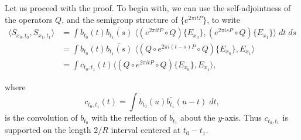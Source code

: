 Let us proceed with the proof. To begin with, we can use the self-adjointness of the operators $Q$, and the semigroup structure of $\{ e^{2 \pi i t P} \}$, to write
%
\begin{align*}
    \langle {S\!}_{x_0,t_0}, {S\!}_{x_1,t_1} \rangle &= \int b_{t_0}(t) \overline{b_{t_1}(s)}\; \Big\langle (e^{2 \pi i t P} \circ Q) \{ E_{x_0} \}, (e^{2 \pi i s P} \circ Q) \{ E_{x_1} \} \Big\rangle\; dt\; ds\\
    &= \int b_{t_0}(t) \overline{b_{t_1}(s)}\; \Big\langle (Q \circ e^{2 \pi i (t - s) P} \circ Q) \{ E_{x_0} \}, E_{x_1} \Big\rangle\\
    &= \int c_{t_0,t_1}(t) \Big\langle (Q \circ e^{2 \pi i t P} \circ Q) \{ E_{x_0} \}, E_{x_1} \Big\rangle,
\end{align*}
%
\begin{comment}

The wave propogators $\{ e^{2 \pi i t P} \}$ form a unitary semigroup. As a result, the Lax parametrix $\{ W(t) \}$ also satisfy the semigroup property \emph{modulo smoothing operators}, i.e. there exists a Schwartz operator $B(t,s)$ whose kernel $B(t,s,x,y)$ is smooth, such that
%
\[ W(s)^* \circ W(t) = W(t - s) + B(t,s). \]
%
This smoothness implies that
%
\[ \| \mathcal{P}_\lambda \{ B(t,s,\cdot,y) \} \|_{L^\infty(S^d)} \lesssim_N \lambda^{-N}, \]
%
and this together with the Weyl Law and the triangle inequality is sufficient to conclude that the kernel $K(t,s,x,y)$ of $Q \circ B(t,s)$ satisfies bounds of the form
%
\[ |K(t,s,x,y)| = \left| \sum \beta(\lambda / R) \mathcal{P}_\lambda \{ B(t,s,\cdot,y) \} \right| \lesssim_N R^{-N}. \]
%
Schur's Lemma, applied to $Q \circ B(t,s)$, together with the uniform boundedness of $Q$, implies that
%
\[ \| (Q \circ B(t,s) \circ Q) \{ E_{x_0} \} \|_{L^2(S^d)} \lesssim_N R^{-N} |E_{x_0}|^{1/2} \]
%
and so Cauchy-Schwartz implies that
%
\begin{align*}
    &\left| \int b_{t_0}(t) \overline{b_{t_1}(s)} \langle (Q \circ B(t,s) \circ Q) \{ E_{x_0} \}, E_{x_1} \rangle\; dt\; ds \right|\\
    &\quad \lesssim_N R^{-N} \int |b_{t_0}(t)| |b_{t_1}(s)| |E_{x_0}|^{1/2} |E_{x_1}|^{1/2}\; dt\; ds\\
    &\quad\lesssim_N C_p(h)^2 R^{-N}.
\end{align*}

\end{comment}
%
where
%
\[ c_{t_0,t_1}(t) = \int b_{t_0}(u) \overline{b_{t_1}}(u - t)\; dt, \]
%
is the convolution of $b_{t_0}$ with the reflection of $\overline{b_{t_1}}$ about the $y$-axis. Thus $c_{t_0,t_1}$ is supported on the length $2/R$ interval centered at $t_0 - t_1$.

